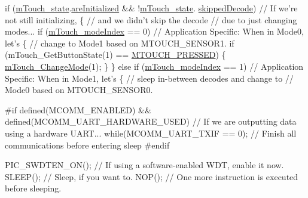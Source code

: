 \begin{DoxyCode}
\textcolor{keywordflow}{if} (\hyperlink{m_touch_8c_ab678fb469a6bdd3d0b75cc4b48adf504}{mTouch\_state}.\hyperlink{structm_touch___state_ab1320a2e9a938dad2a563147945e97f9}{areInitialized} && !\hyperlink{m_touch_8c_ab678fb469a6bdd3d0b75cc4b48adf504}{mTouch\_state}.
      \hyperlink{structm_touch___state_a5bc7c6dc7f7d0fb027257c8911a0deba}{skippedDecode})   \textcolor{comment}{// If we're not still initializing,}
\{                                                                 \textcolor{comment}{// and we didn't skip the decode}
                                                                  \textcolor{comment}{// due to just changing modes...}
    \textcolor{keywordflow}{if} (\hyperlink{m_touch_cap_2_p_i_c12_f_01_p_i_c16_f_01_library_2m_touch_8h_ac9181f1601e76c0ab3a4458c424ff707}{mTouch\_modeIndex} == 0)                            \textcolor{comment}{// Application Specific: When in
       Mode0, let's}
    \{                                                     \textcolor{comment}{//    change to Mode1 based on MTOUCH\_SENSOR1.}
        \textcolor{keywordflow}{if} (mTouch\_GetButtonState(1) == \hyperlink{m_touch_cap_2_p_i_c12_f_01_p_i_c16_f_01_library_2m_touch_8h_a7d72b112c35bc51408030eb7ecdcacd2aed5b3f2b7065991010f45eb04759ef01}{MTOUCH\_PRESSED})
        \{
            \hyperlink{m_touch_cap_2_p_i_c12_f_01_p_i_c16_f_01_library_2m_touch_8h_ad4b3c623e779e2b0cbe5a8ace84c1561}{mTouch\_ChangeMode}(1); 
        \}
    \}
    \textcolor{keywordflow}{else} \textcolor{keywordflow}{if} (\hyperlink{m_touch_cap_2_p_i_c12_f_01_p_i_c16_f_01_library_2m_touch_8h_ac9181f1601e76c0ab3a4458c424ff707}{mTouch\_modeIndex} == 1)                       \textcolor{comment}{// Application Specific: When in
       Mode1, let's}
    \{                                                     \textcolor{comment}{//    sleep in-between decodes and change to}
                                                          \textcolor{comment}{//    Mode0 based on MTOUCH\_SENSOR0.}

\textcolor{preprocessor}{        #if defined(MCOMM\_ENABLED) && defined(MCOMM\_UART\_HARDWARE\_USED) }
                                          \textcolor{comment}{// If we are outputting data using a hardware UART...}
            \textcolor{keywordflow}{while}(MCOMM\_UART\_TXIF == 0);  \textcolor{comment}{// Finish all communications before entering sleep}
\textcolor{preprocessor}{        #endif}
        
        PIC\_SWDTEN\_ON();                  \textcolor{comment}{// If using a software-enabled WDT, enable it now.}
        SLEEP();                          \textcolor{comment}{// Sleep, if you want to.}
        NOP();                            \textcolor{comment}{// One more instruction is executed before sleeping.}
        

\end{DoxyCode}
